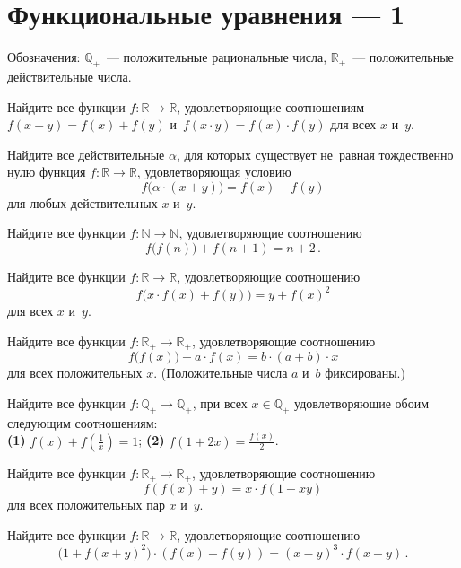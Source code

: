 
\section*{Функциональные уравнения --- 1}


Обозначения: $\mathbb{Q}_+$~--- положительные рациональные числа,
$\mathbb{R}_+$~--- положительные действительные числа.

\begin{problems}

\item
Найдите все функции $f \colon \mathbb{R} \to \mathbb{R}$, удовлетворяющие
соотношениям $f(x + y) = f(x) + f(y)$ и~$f(x \cdot y) = f(x) \cdot f(y)$
для всех $x$ и~$y$.

\item
Найдите все действительные $\alpha$, для которых существует не~равная
тождественно нулю функция $f \colon \mathbb{R} \to \mathbb{R}$, удовлетворяющая
условию
\[
    f \bigl( \alpha \cdot (x + y) \bigr)
=
    f(x) + f(y)
\]
для любых действительных $x$ и~$y$.

\item
Найдите все функции $f \colon \mathbb{N} \to \mathbb{N}$, удовлетворяющие
соотношению
\[
    f \bigl( f(n) \bigr) + f(n + 1)
=
    n + 2
\,.\]

\item
Найдите все функции $f \colon \mathbb{R} \to \mathbb{R}$, удовлетворяющие
соотношению
\[
    f \bigl( x \cdot f(x) + f(y) \bigr)
=
    y + f(x)^2
\]
для всех $x$ и~$y$.

\item
Найдите все функции $f \colon \mathbb{R}_+ \to \mathbb{R}_+$, удовлетворяющие
соотношению
\[
    f \bigl( f(x) \bigr) + a \cdot f(x)
=
    b \cdot (a + b) \cdot x
\]
для всех положительных $x$.
(Положительные числа $a$ и~$b$ фиксированы.)

\item
Найдите все функции $f \colon \mathbb{Q}_+ \to \mathbb{Q}_+$,
при всех $x \in \mathbb{Q}_+$ удовлетворяющие обоим следующим соотношениям:
\\
\textbf{(1)} $f(x) + f\left(\frac{1}{x}\right) = 1$;
\quad
\textbf{(2)} $f(1 + 2 x) = \frac{f(x)}{2}$.

\item
Найдите все функции $f \colon \mathbb{R}_+ \to \mathbb{R}_+$, удовлетворяющие
соотношению
\[
    f(f(x) + y) = x \cdot f(1 + x y)
\]
для всех положительных пар $x$ и~$y$.

\item
Найдите все функции $f \colon \mathbb{R} \to \mathbb{R}$, удовлетворяющие
соотношению
\[
    \bigl(1 + f(x + y)^2 \bigr) \cdot (f(x) - f(y))
=
    (x - y)^3 \cdot f(x + y)
\,.\]

\end{problems}

